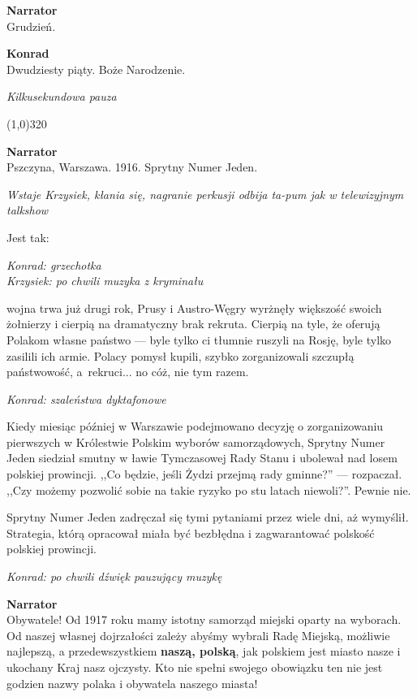\documentclass[11pt,a4paper,oneside]{article}
\begin{document}
\textbf{Narrator}\\
Grudzień.

{\color{konrad}
\textbf{Konrad}\\
Dwudziesty piąty. Boże Narodzenie.
}

{\color{light-gray} \emph{Kilkusekundowa pauza}}

\line(1,0){320}

\textbf{Narrator}\\
Pszczyna, Warszawa. 1916. Sprytny Numer Jeden. 

{\color{light-gray} \emph{Wstaje Krzysiek, kłania się, nagranie perkusji odbija
ta-pum jak w telewizyjnym talkshow}}

Jest tak: 

{\color{konrad}   \emph{Konrad: grzechotka}}\\
{\color{krzysiek} \emph{Krzysiek: po chwili muzyka z kryminału}}

wojna trwa już drugi rok, Prusy i Austro-Węgry wyrżnęły większość
swoich żołnierzy i cierpią na dramatyczny brak rekruta. Cierpią na
tyle, że oferują Polakom własne państwo --- byle tylko ci tłumnie
ruszyli na Rosję, byle tylko zasilili ich armie. Polacy pomysł kupili,
szybko zorganizowali szczupłą państwowość, a~rekruci... no cóż, nie
tym razem.

{\color{konrad}   \emph{Konrad: szaleństwa dyktafonowe}}

Kiedy miesiąc później w Warszawie podejmowano decyzję o zorganizowaniu
pierwszych w Królestwie Polskim wyborów samorządowych, Sprytny Numer
Jeden siedział smutny w ławie Tymczasowej Rady Stanu i ubolewał nad
losem polskiej prowincji. ,,Co będzie, jeśli Żydzi przejmą rady
gminne?'' --- rozpaczał.  ,,Czy możemy pozwolić sobie na takie ryzyko
po stu latach niewoli?''. Pewnie nie.

Sprytny Numer Jeden zadręczał się tymi pytaniami przez wiele dni, aż
wymyślił.  Strategia, którą opracował miała być bezbłędna
i zagwarantować polskość polskiej prowincji. 

{\color{konrad} \emph{Konrad: po chwili dźwięk pauzujący muzykę}}

\textbf{Narrator}\\
Obywatele! Od 1917 roku mamy istotny samorząd miejski oparty na
wyborach. Od naszej własnej dojrzałości zależy abyśmy wybrali Radę
Miejską, możliwie najlepszą, a przedewszystkiem \textbf{naszą,
polską}, jak polskiem jest miasto nasze i ukochany Kraj nasz ojczysty.
Kto nie spełni swojego obowiązku ten nie jest godzien nazwy polaka
i obywatela naszego miasta!
\end{document}

